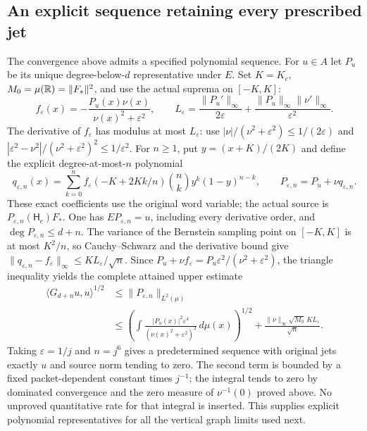 \subsection{An explicit sequence retaining every prescribed jet}
The convergence above admits a specified polynomial sequence.
For $u\in A$ let $P_u$ be its unique degree-below-$d$ representative
under $E$. Set $K=K_c$, $M_0=\mu(\mathbb R)=\|F_*\|^2$, and use the
actual suprema on $[-K,K]$:
\[
 f_\varepsilon(x)=-\frac{P_u(x)\nu(x)}{\nu(x)^2+\varepsilon^2},
 \qquad
 L_\varepsilon=
 \frac{\|P_u'\|_\infty}{2\varepsilon}
       +\frac{\|P_u\|_\infty\|\nu'\|_\infty}{\varepsilon^2}.
 \tag{GC13}\label{gc:regularized-inverse}
\]
The derivative of $f_\varepsilon$ has modulus at most
$L_\varepsilon$: use
$|\nu|/(\nu^2+\varepsilon^2)\le1/(2\varepsilon)$ and
$|\varepsilon^2-\nu^2|/(\nu^2+\varepsilon^2)^2\le1/\varepsilon^2$.
For $n\ge1$, put $y=(x+K)/(2K)$ and define the explicit
degree-at-most-$n$ polynomial
\[
 q_{\varepsilon,n}(x)=\sum_{k=0}^n
 f_\varepsilon(-K+2Kk/n)\binom nk y^k(1-y)^{n-k},
 \qquad P_{\varepsilon,n}=P_u+\nu q_{\varepsilon,n}.
 \tag{GC14}\label{gc:constructive-sequence}
\]
These exact coefficients use the original word variable; the
actual source is $P_{\varepsilon,n}(\mathsf H_c)F_*$.
One has $E P_{\varepsilon,n}=u$, including every derivative order,
and $\deg P_{\varepsilon,n}\le d+n$.
The variance of the Bernstein sampling point on $[-K,K]$ is
at most $K^2/n$, so Cauchy--Schwarz and the derivative bound give
$\|q_{\varepsilon,n}-f_\varepsilon\|_\infty
\le K L_\varepsilon/\sqrt n$.
Since $P_u+\nu f_\varepsilon=P_u\varepsilon^2/
(\nu^2+\varepsilon^2)$, the triangle inequality yields the
complete attained upper estimate
\[
 \begin{split}
 \langle G_{d+n}u,u\rangle^{1/2}
 &\le\|P_{\varepsilon,n}\|_{L^2(\mu)}\\
 &\le\left(\int
       \frac{|P_u(x)|^2\varepsilon^4}
            {(\nu(x)^2+\varepsilon^2)^2}\,d\mu(x)\right)^{1/2}
       +\frac{\|\nu\|_\infty\sqrt{M_0}\,K L_\varepsilon}{\sqrt n}.
 \end{split}
 \tag{GC15}\label{gc:constructive-bound}
\]
Taking $\varepsilon=1/j$ and $n=j^6$ gives a predetermined
sequence with original jets exactly $u$ and source norm tending
to zero. The second term is bounded by a fixed packet-dependent
constant times $j^{-1}$; the integral tends to zero by dominated
convergence and the zero measure of $\nu^{-1}(0)$ proved above.
No unproved quantitative rate for that integral is inserted.
This supplies explicit polynomial representatives for all the
vertical graph limits used next.

